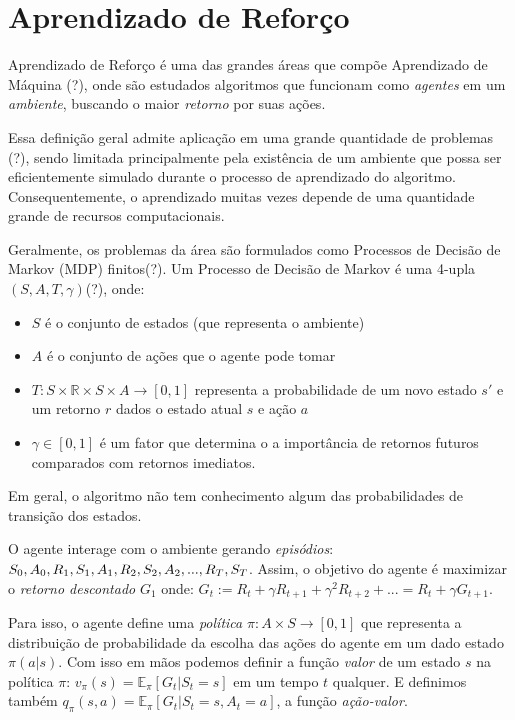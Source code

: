 \chapter{Aprendizado de Reforço}
\label{cap:reforco}

Aprendizado de Reforço é uma das grandes áreas que compõe Aprendizado de Máquina (?),
onde são estudados algoritmos que funcionam como \textit{agentes} em um \textit{ambiente},
buscando o maior \textit{retorno} por suas ações.

Essa definição geral admite aplicação em uma grande quantidade de problemas (?),
sendo limitada principalmente pela existência de um ambiente que possa ser eficientemente simulado durante o processo de aprendizado do algoritmo.
Consequentemente, o aprendizado muitas vezes depende de uma quantidade grande de recursos computacionais.

Geralmente, os problemas da área são formulados como Processos de Decisão de Markov (MDP) finitos(?).
Um Processo de Decisão de Markov é uma 4-upla $(S,A,T,\gamma)$(?), onde:
\begin{itemize}
    \item $S$ é o conjunto de estados (que representa o ambiente)
    \item $A$ é o conjunto de ações que o agente pode tomar
    \item $T: S \times \mathbb{R} \times S \times A \to [0, 1]$ representa a probabilidade de um novo estado $s'$ e um retorno $r$ dados o estado atual $s$ e ação $a$
    \item $\gamma \in [0, 1]$ é um fator que determina o a importância de retornos futuros comparados com retornos imediatos.   
\end{itemize}

Em geral, o algoritmo não tem conhecimento algum das probabilidades de transição dos estados.

O agente interage com o ambiente gerando \textit{episódios}: 
$S_0, A_0, R_1, S_1, A_1, R_2, S_2, A_2, ..., R_T, \\S_T$.
Assim, o objetivo do agente é maximizar o \textit{retorno descontado} $G_1$ onde:
$G_t := R_t + \gamma R_{t + 1} + \gamma^2R_{t + 2} + ... = R_t + \gamma G_{t + 1}$.

Para isso, o agente define uma \textit{política} $\pi: A \times S \to [0, 1]$ 
que representa a distribuição de probabilidade da escolha das ações do agente em um dado estado $\pi(a | s)$.
Com isso em mãos podemos definir a função \textit{valor} de um estado $s$ na política $\pi$: $v_{\pi}(s) = \mathbb{E}_{\pi}[G_t | S_t = s]$ em um tempo $t$ qualquer.
E definimos também $q_{\pi}(s, a) = \mathbb{E}_{\pi}[G_t | S_t = s, A_t = a]$, a função \textit{ação-valor}.